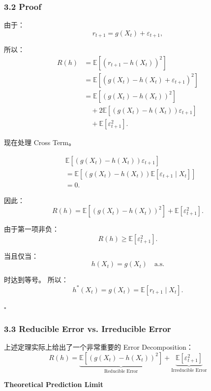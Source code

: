 \hypertarget{part-4-60-0001-proof}{%
\subsubsection{3.2 Proof}\label{part-4-60-0001-proof}}

由于：
\[r_{t+1}=g(X_t)+\varepsilon_{t+1},\]

所以：
\[\begin{aligned}
R(h)
&=\mathbb E[(r_{t+1}-h(X_t))^2]\\
&=\mathbb E[
(g(X_t)-h(X_t)+\varepsilon_{t+1})^2
]\\
&=\mathbb E[(g(X_t)-h(X_t))^2]\\
&\quad+2\mathbb E[
(g(X_t)-h(X_t))\varepsilon_{t+1}
]\\
&\quad+\mathbb E[\varepsilon_{t+1}^2].
\end{aligned}\]

现在处理 Cross Term。

\[\begin{aligned}
&\mathbb E[
(g(X_t)-h(X_t))\varepsilon_{t+1}
]\\
&=\mathbb E\left[
(g(X_t)-h(X_t))
\mathbb E[\varepsilon_{t+1}\mid X_t]
\right]\\
&=0.
\end{aligned}\]

因此：
\[\boxed{
R(h)
=
\mathbb E[(g(X_t)-h(X_t))^2]
+
\mathbb E[\varepsilon_{t+1}^2].
}\]

由于第一项非负：
\[R(h)\geq\mathbb E[\varepsilon_{t+1}^2].\]

当且仅当：
\[h(X_t)=g(X_t)\quad\text{a.s.}\]

时达到等号。 所以：
\[\boxed{
h^*(X_t)
=
g(X_t)
=
\mathbb E[r_{t+1}\mid X_t].
}\]

\(\square\)

\hypertarget{part-4-60-0001-reducible-error-vs.-irreducible-error}{%
\subsubsection{3.3 Reducible Error vs. Irreducible Error}\label{part-4-60-0001-reducible-error-vs.-irreducible-error}}

上述定理实际上给出了一个非常重要的 Error Decomposition：
\[\boxed{
R(h)
=
\underbrace{
\mathbb E[(g(X_t)-h(X_t))^2]
}_{\text{Reducible Error}}
+
\underbrace{
\mathbb E[\varepsilon_{t+1}^2]
}_{\text{Irreducible Error}}
}\]

\textbf{Theoretical Prediction Limit}


